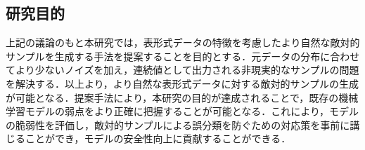 \subsection{研究目的}
上記の議論のもと本研究では，表形式データの特徴を考慮したより自然な敵対的サンプルを生成する手法を提案することを目的とする．元データの分布に合わせてより少ないノイズを加え，連続値として出力される非現実的なサンプルの問題を解決する．以上より，より自然な表形式データに対する敵対的サンプルの生成が可能となる．提案手法により，本研究の目的が達成されることで，既存の機械学習モデルの弱点をより正確に把握することが可能となる．これにより，モデルの脆弱性を評価し，敵対的サンプルによる誤分類を防ぐための対応策を事前に講じることができ，モデルの安全性向上に貢献することができる．